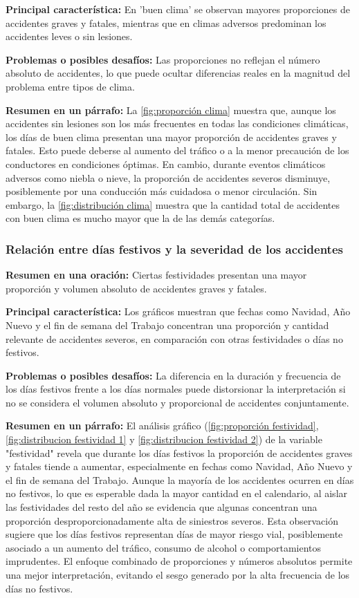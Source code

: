 \documentclass{book}
\begin{document}
\textbf{Principal característica:} En 'buen clima' se observan mayores proporciones de accidentes graves y fatales, mientras que en climas adversos predominan los accidentes leves o sin lesiones.

\textbf{Problemas o posibles desafíos:} Las proporciones no reflejan el número absoluto de accidentes, lo que puede ocultar diferencias reales en la magnitud del problema entre tipos de clima.

\textbf{Resumen en un párrafo:} La \ref{fig:proporción clima} muestra que, aunque los accidentes sin lesiones son los más frecuentes en todas las condiciones climáticas, los días de buen clima presentan una mayor proporción de accidentes graves y fatales. Esto puede deberse al aumento del tráfico o a la menor precaución de los conductores en condiciones óptimas. En cambio, durante eventos climáticos adversos como niebla o nieve, la proporción de accidentes severos disminuye, posiblemente por una conducción más cuidadosa o menor circulación. Sin embargo, la \ref{fig:distribución clima} muestra que la cantidad total de accidentes con buen clima es mucho mayor que la de las demás categorías.


\subsubsection{Relación entre días festivos y la severidad de los accidentes}

\textbf{Resumen en una oración:} Ciertas festividades presentan una mayor proporción y volumen absoluto de accidentes graves y fatales.

\textbf{Principal característica:} Los gráficos muestran que fechas como Navidad, Año Nuevo y el fin de semana del Trabajo concentran una proporción y cantidad relevante de accidentes severos, en comparación con otras festividades o días no festivos.

\textbf{Problemas o posibles desafíos:} La diferencia en la duración y frecuencia de los días festivos frente a los días normales puede distorsionar la interpretación si no se considera el volumen absoluto y proporcional de accidentes conjuntamente.

\textbf{Resumen en un párrafo:} El análisis gráfico (\ref{fig:proporción festividad}, \ref{fig:distribucion festividad 1} y \ref{fig:distribucion festividad 2}) de la variable "festividad" revela que durante los días festivos la proporción de accidentes graves y fatales tiende a aumentar, especialmente en fechas como Navidad, Año Nuevo y el fin de semana del Trabajo. Aunque la mayoría de los accidentes ocurren en días no festivos, lo que es esperable dada la mayor cantidad en el calendario, al aislar las festividades del resto del año se evidencia que algunas concentran una proporción desproporcionadamente alta de siniestros severos. Esta observación sugiere que los días festivos representan días de mayor riesgo vial, posiblemente asociado a un aumento del tráfico, consumo de alcohol o comportamientos imprudentes. El enfoque combinado de proporciones y números absolutos permite una mejor interpretación, evitando el sesgo generado por la alta frecuencia de los días no festivos.
\end{document}
